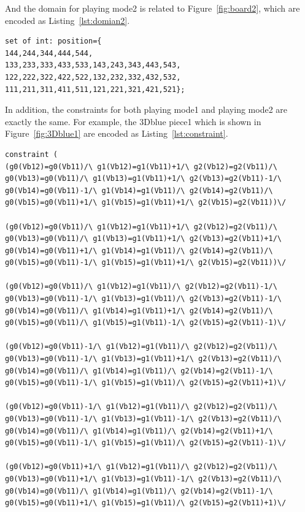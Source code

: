 And the domain for playing mode2 is related to Figure~\ref{fig:board2}, which are encoded as Listing~\ref{lst:domian2}.
\begin{lstlisting}[language=minizinc,numbers=none,caption={Encoding for the domain of playing mode2},label={lst:domian2}]
set of int: position={
144,244,344,444,544,
133,233,333,433,533,143,243,343,443,543,
122,222,322,422,522,132,232,332,432,532,
111,211,311,411,511,121,221,321,421,521};
\end{lstlisting}
\bigskip
\smallbreak
In addition, the constraints for both playing mode1 and playing mode2 are exactly the same. For example, the 3Dblue piece1 which is shown in Figure~\ref{fig:3Dblue1} are encoded as Listing~\ref{lst:constraint}.
\begin{lstlisting}[language=minizinc,numbers=none,caption={Encoding for 3Dblue piece1},label={lst:constraint}]
constraint ( 
(g0(Vb12)=g0(Vb11)/\ g1(Vb12)=g1(Vb11)+1/\ g2(Vb12)=g2(Vb11)/\ g0(Vb13)=g0(Vb11)/\ g1(Vb13)=g1(Vb11)+1/\ g2(Vb13)=g2(Vb11)-1/\ g0(Vb14)=g0(Vb11)-1/\ g1(Vb14)=g1(Vb11)/\ g2(Vb14)=g2(Vb11)/\ g0(Vb15)=g0(Vb11)+1/\ g1(Vb15)=g1(Vb11)+1/\ g2(Vb15)=g2(Vb11))\/ 

(g0(Vb12)=g0(Vb11)/\ g1(Vb12)=g1(Vb11)+1/\ g2(Vb12)=g2(Vb11)/\ g0(Vb13)=g0(Vb11)/\ g1(Vb13)=g1(Vb11)+1/\ g2(Vb13)=g2(Vb11)+1/\ g0(Vb14)=g0(Vb11)+1/\ g1(Vb14)=g1(Vb11)/\ g2(Vb14)=g2(Vb11)/\ g0(Vb15)=g0(Vb11)-1/\ g1(Vb15)=g1(Vb11)+1/\ g2(Vb15)=g2(Vb11))\/ 

(g0(Vb12)=g0(Vb11)/\ g1(Vb12)=g1(Vb11)/\ g2(Vb12)=g2(Vb11)-1/\ g0(Vb13)=g0(Vb11)-1/\ g1(Vb13)=g1(Vb11)/\ g2(Vb13)=g2(Vb11)-1/\ g0(Vb14)=g0(Vb11)/\ g1(Vb14)=g1(Vb11)+1/\ g2(Vb14)=g2(Vb11)/\ g0(Vb15)=g0(Vb11)/\ g1(Vb15)=g1(Vb11)-1/\ g2(Vb15)=g2(Vb11)-1)\/ 

(g0(Vb12)=g0(Vb11)-1/\ g1(Vb12)=g1(Vb11)/\ g2(Vb12)=g2(Vb11)/\ g0(Vb13)=g0(Vb11)-1/\ g1(Vb13)=g1(Vb11)+1/\ g2(Vb13)=g2(Vb11)/\ g0(Vb14)=g0(Vb11)/\ g1(Vb14)=g1(Vb11)/\ g2(Vb14)=g2(Vb11)-1/\ g0(Vb15)=g0(Vb11)-1/\ g1(Vb15)=g1(Vb11)/\ g2(Vb15)=g2(Vb11)+1)\/ 

(g0(Vb12)=g0(Vb11)-1/\ g1(Vb12)=g1(Vb11)/\ g2(Vb12)=g2(Vb11)/\ g0(Vb13)=g0(Vb11)-1/\ g1(Vb13)=g1(Vb11)-1/\ g2(Vb13)=g2(Vb11)/\ g0(Vb14)=g0(Vb11)/\ g1(Vb14)=g1(Vb11)/\ g2(Vb14)=g2(Vb11)+1/\ g0(Vb15)=g0(Vb11)-1/\ g1(Vb15)=g1(Vb11)/\ g2(Vb15)=g2(Vb11)-1)\/ 

(g0(Vb12)=g0(Vb11)+1/\ g1(Vb12)=g1(Vb11)/\ g2(Vb12)=g2(Vb11)/\ g0(Vb13)=g0(Vb11)+1/\ g1(Vb13)=g1(Vb11)-1/\ g2(Vb13)=g2(Vb11)/\ g0(Vb14)=g0(Vb11)/\ g1(Vb14)=g1(Vb11)/\ g2(Vb14)=g2(Vb11)-1/\ g0(Vb15)=g0(Vb11)+1/\ g1(Vb15)=g1(Vb11)/\ g2(Vb15)=g2(Vb11)+1)\/ 


\end{lstlisting}
